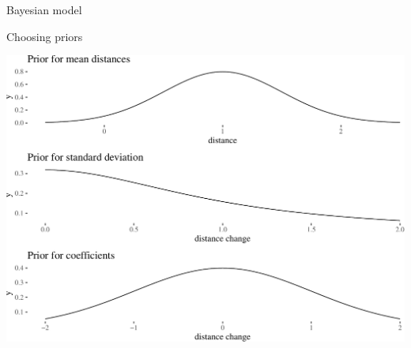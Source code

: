 \documentclass[10pt,ignorenonframetext,x11names, dvipsnames, bibspacing,natbib]{beamer}
\begin{document}
\begin{frame}{Bayesian model}
\protect\hypertarget{bayesian-model}{}

\begin{block}{Choosing priors}

\begin{center}\includegraphics[width=1\linewidth]{presentationESSLLI_files/figure-beamer/priorsVis-1} \end{center}

\end{block}

\end{frame}
\end{document}
